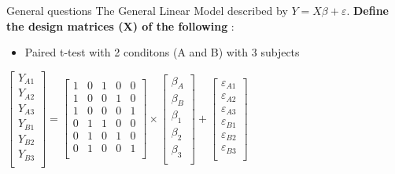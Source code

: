 \documentclass{beamer}
\begin{document}
\begin{frame}{General questions}   
The General Linear Model described by $Y=X\beta+\varepsilon$. \textbf{Define the design matrices (X) of the following} :
  
      \begin{itemize}
	\item Paired t-test with 2 conditons (A and B) with 3 subjects
      \end{itemize}
	
      \begin{center}
	$
	\left[\begin{array}{c}
	Y_{A1} \\
	Y_{A2} \\
	Y_{A3} \\
	Y_{B1} \\
	Y_{B2} \\
	Y_{B3} \\
	\end{array}\right]
      =
      \left[\begin{array}{ccccc}1 & 0 & 1 & 0 & 0\\ 
			      1 & 0 & 0 & 1 & 0\\
			      1 & 0 & 0 & 0 & 1\\
			      0 & 1 & 1 & 0 & 0\\
			      0 & 1 & 0 & 1 & 0\\
			      0 & 1 & 0 & 0 & 1\\ 
      \end{array}\right] 
      \times
      \left[\begin{array}{c} 
      \beta_{A} \\
      \beta_{B} \\
      \beta_{1} \\
      \beta_{2} \\
      \beta_{3} \\
      \end{array}\right] 
      + 
      \left[\begin{array}{c} 
      \varepsilon_{A1} \\
      \varepsilon_{A2} \\
      \varepsilon_{A3} \\
      \varepsilon_{B1} \\
      \varepsilon_{B2} \\
      \varepsilon_{B3} \\
      \end{array}\right] 
	$
      \end{center}
\end{frame}
\end{document}
